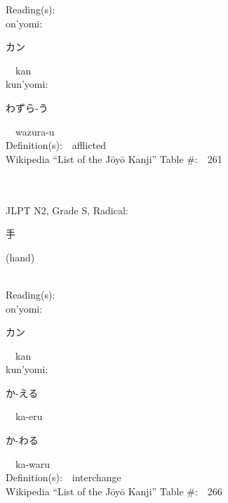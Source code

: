 \begin{multicols}{2}
Reading(s):\ \ \\
{\hspace*{1em}}on'yomi:\ \ \\
{\hspace*{2em}}{\begin{CJK}{UTF8}{min} カン \end{CJK}}\ \ kan\ \ \\
{\hspace*{1em}}kun'yomi:\ \ \\
{\hspace*{2em}}{\begin{CJK}{UTF8}{min} わずら-う \end{CJK}}\ \ wazura-u\ \ \\
Definition(s):\ \ afflicted \\
Wikipedia ``List of the J\=oy\=o Kanji'' Table \#:\ \ 261 \\
\ \ \\
{\fontsize{34pt}{40pt}  }\ \ \\  %
{JLPT N2, Grade S, Radical:\ \ {\begin{CJK}{UTF8}{min} 手 \end{CJK}} (hand) } \\
Reading(s):\ \ \\
{\hspace*{1em}}on'yomi:\ \ \\
{\hspace*{2em}}{\begin{CJK}{UTF8}{min} カン \end{CJK}}\ \ kan\ \ \\
{\hspace*{1em}}kun'yomi:\ \ \\
{\hspace*{2em}}{\begin{CJK}{UTF8}{min} か-える \end{CJK}}\ \ ka-eru\ \ \\
{\hspace*{2em}}{\begin{CJK}{UTF8}{min} か-わる \end{CJK}}\ \ ka-waru\ \ \\
Definition(s):\ \ interchange \\
Wikipedia ``List of the J\=oy\=o Kanji'' Table \#:\ \ 266 \\
\ \ \\

\end{multicols}

